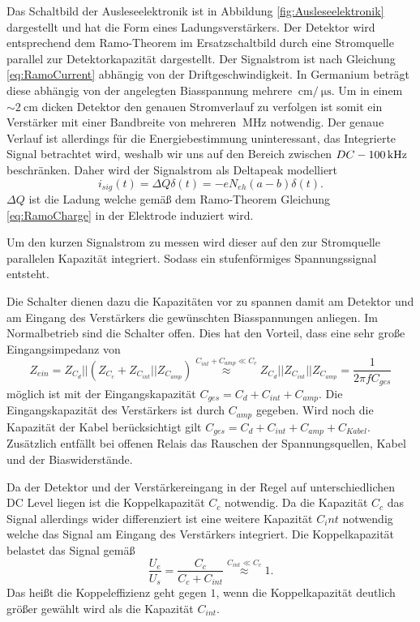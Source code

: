 Das Schaltbild der Ausleseelektronik ist in Abbildung \ref{fig:Ausleseelektronik} dargestellt und hat die Form eines Ladungsverstärkers.
Der Detektor wird entsprechend dem Ramo-Theorem im Ersatzschaltbild durch eine Stromquelle parallel zur Detektorkapazität dargestellt.
Der Signalstrom ist nach Gleichung \eqref{eq:RamoCurrent} abhängig von der Driftgeschwindigkeit.
In Germanium beträgt diese abhängig von der angelegten Biasspannung mehrere $\SI{}{\centi\meter}/\SI{}{\micro\second}$\cite{Jacoboni1981}.
Um in einem $\sim\SI{2}{\centi\meter}$ dicken Detektor den genauen Stromverlauf zu verfolgen ist somit ein Verstärker mit einer Bandbreite von mehreren $\SI{}{\mega\hertz}$ notwendig.
Der genaue Verlauf ist allerdings für die Energiebestimmung uninteressant, das Integrierte Signal betrachtet wird, weshalb wir uns auf den Bereich zwischen $DC\--\SI{100}{\kilo\hertz}$ beschränken.
Daher wird der Signalstrom als Deltapeak modelliert
\begin{equation}
i_{sig}(t) = \Delta Q \delta(t) = -eN_{eh}(a-b)\delta(t).
\end{equation}
$\Delta Q$ ist die Ladung welche gemäß dem Ramo-Theorem Gleichung \eqref{eq:RamoCharge} in der Elektrode induziert wird.

Um den kurzen Signalstrom zu messen wird dieser auf den zur Stromquelle parallelen Kapazität integriert.
Sodass ein stufenförmiges Spannungssignal entsteht.

Die Schalter dienen dazu die Kapazitäten vor zu spannen damit am Detektor und am Eingang des Verstärkers die gewünschten Biasspannungen anliegen.
Im Normalbetrieb sind die Schalter offen.
Dies hat den Vorteil, dass eine sehr große Eingangsimpedanz von 
\begin{equation}
Z_{ein} = Z_{C_d}||(Z_{C_c} + Z_{C_{int}}||Z_{C_{amp}}) \stackrel{C_{int} + C_{amp} \ll C_c}{\approx} Z_{C_d}||Z_{C_{int}}||Z_{C_{amp}} =  \frac{1}{2\pi f C_{ges}}
\label{eq:EingangsC}
\end{equation}
möglich ist mit der Eingangskapazität $C_{ges} = C_d + C_{int} + C_{amp}$.
Die Eingangskapazität des Verstärkers ist durch $C_{amp}$ gegeben.
Wird noch die Kapazität der Kabel berücksichtigt gilt $C_{ges} = C_d + C_{int} + C_{amp} +  C_{Kabel}$. 
Zusätzlich entfällt bei offenen Relais das Rauschen der Spannungsquellen, Kabel und der Biaswiderstände.

Da der Detektor und der Verstärkereingang in der Regel auf unterschiedlichen DC Level liegen ist die Koppelkapazität $C_c$ notwendig.
Da die Kapazität $C_c$ das Signal allerdings wider differenziert ist eine weitere Kapazität $C_int$ notwendig welche das Signal am Eingang des Verstärkers integriert.
Die Koppelkapazität belastet das Signal gemäß
\begin{equation}
\frac{U_e}{U_s} = \frac{C_c}{C_c + C_{int}} \stackrel{C_{int} \ll C_c}{\approx} 1.
\end{equation}
Das heißt die Koppeleffizienz geht gegen $1$, wenn die Koppelkapazität deutlich größer gewählt wird als die Kapazität $C_{int}$.

